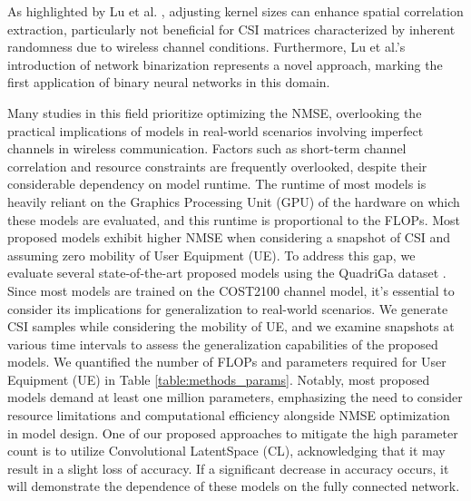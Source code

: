 \documentclass[lettersize,journal]{IEEEtran}
\begin{document}
As highlighted by Lu et al. \cite{abp}, adjusting kernel sizes can enhance spatial correlation extraction, particularly not beneficial for CSI matrices characterized by inherent randomness due to wireless channel conditions. Furthermore, Lu et al.'s introduction\cite{abp} of network binarization represents a novel approach, marking the first application of binary neural networks \cite{aaa1} in this domain.

Many studies in this field prioritize optimizing the NMSE, overlooking the practical implications of models in real-world scenarios involving imperfect channels in wireless communication. Factors such as short-term channel correlation and resource constraints are frequently overlooked, despite their considerable dependency on model runtime. The runtime of most models is heavily reliant on the Graphics Processing Unit (GPU) of the hardware on which these models are evaluated, and this runtime is proportional to the FLOPs. Most proposed models exhibit higher NMSE when considering a snapshot of CSI and assuming zero mobility of User Equipment (UE). To address this gap, we evaluate several state-of-the-art proposed models using the QuadriGa dataset \cite{abu}. Since most models are trained on the COST2100 \cite{abf} channel model, it's essential to consider its implications for generalization to real-world scenarios. We generate CSI samples while considering the mobility of UE, and we examine snapshots at various time intervals to assess the generalization capabilities of the proposed models. We quantified the number of FLOPs and parameters required for User Equipment (UE) in Table \ref{table:methods_params}. Notably, most proposed models demand at least one million parameters, emphasizing the need to consider resource limitations and computational efficiency alongside NMSE optimization in model design. One of our proposed approaches to mitigate the high parameter count is to utilize Convolutional LatentSpace (CL), acknowledging that it may result in a slight loss of accuracy. If a significant decrease in accuracy occurs, it will demonstrate the dependence of these models on the fully connected network.



\end{document}
